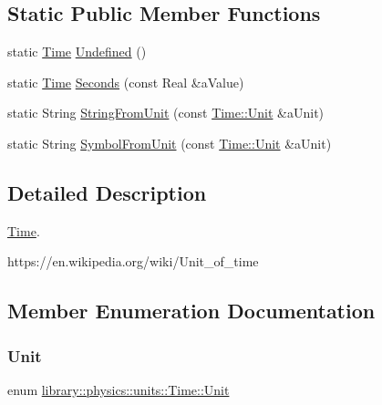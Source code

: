 \subsection*{Static Public Member Functions}
\begin{DoxyCompactItemize}
\item 
static \hyperlink{classlibrary_1_1physics_1_1units_1_1_time}{Time} \hyperlink{classlibrary_1_1physics_1_1units_1_1_time_a532c992968408dcb70f5ee94e672c595}{Undefined} ()
\item 
static \hyperlink{classlibrary_1_1physics_1_1units_1_1_time}{Time} \hyperlink{classlibrary_1_1physics_1_1units_1_1_time_a07132f52798140d876eaeef4292688d4}{Seconds} (const Real \&a\+Value)
\item 
static String \hyperlink{classlibrary_1_1physics_1_1units_1_1_time_a413c7045742e568efc2e0e2b64eb6c86}{String\+From\+Unit} (const \hyperlink{classlibrary_1_1physics_1_1units_1_1_time_ab876a6a05c9a2f28905f2753bfd64109}{Time\+::\+Unit} \&a\+Unit)
\item 
static String \hyperlink{classlibrary_1_1physics_1_1units_1_1_time_aa48f07fb50e09cd22b9b6b7a83275f39}{Symbol\+From\+Unit} (const \hyperlink{classlibrary_1_1physics_1_1units_1_1_time_ab876a6a05c9a2f28905f2753bfd64109}{Time\+::\+Unit} \&a\+Unit)
\end{DoxyCompactItemize}


\subsection{Detailed Description}
\hyperlink{classlibrary_1_1physics_1_1units_1_1_time}{Time}. 

https\+://en.wikipedia.\+org/wiki/\+Unit\+\_\+of\+\_\+time 

\subsection{Member Enumeration Documentation}
\mbox{\label{classlibrary_1_1physics_1_1units_1_1_time_ab876a6a05c9a2f28905f2753bfd64109}} 
\subsubsection{\texorpdfstring{Unit}{Unit}}
{\footnotesize\ttfamily enum \hyperlink{classlibrary_1_1physics_1_1units_1_1_time_ab876a6a05c9a2f28905f2753bfd64109}{library\+::physics\+::units\+::\+Time\+::\+Unit}\hspace{0.3cm}{\ttfamily [strong]}}

